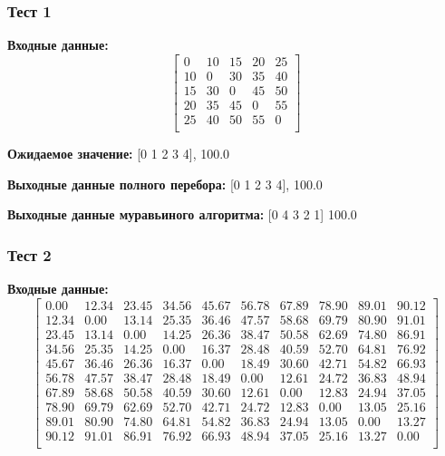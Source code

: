 \subsubsection{Тест 1}

\textbf{Входные данные:}
\[
\begin{bmatrix}
	0 & 10 & 15 & 20 & 25 \\
	10 & 0 & 30 & 35 & 40 \\
	15 & 30 & 0 & 45 & 50 \\
	20 & 35 & 45 & 0 & 55 \\
	25 & 40 & 50 & 55 & 0 \\
\end{bmatrix}
\]

\textbf{Ожидаемое значение:} [0 1 2 3 4], 100.0


\textbf{Выходные данные полного перебора:} [0 1 2 3 4], 100.0


\textbf{Выходные данные муравьиного алгоритма:} [0 4 3 2 1] 100.0


\subsubsection{Тест 2}

\textbf{Входные данные:}
\[
\begin{bmatrix}
	0.00 & 12.34 & 23.45 & 34.56 & 45.67 & 56.78 & 67.89 & 78.90 & 89.01 & 90.12 \\
	12.34 & 0.00 & 13.14 & 25.35 & 36.46 & 47.57 & 58.68 & 69.79 & 80.90 & 91.01 \\
	23.45 & 13.14 & 0.00 & 14.25 & 26.36 & 38.47 & 50.58 & 62.69 & 74.80 & 86.91 \\
	34.56 & 25.35 & 14.25 & 0.00 & 16.37 & 28.48 & 40.59 & 52.70 & 64.81 & 76.92 \\
	45.67 & 36.46 & 26.36 & 16.37 & 0.00 & 18.49 & 30.60 & 42.71 & 54.82 & 66.93 \\
	56.78 & 47.57 & 38.47 & 28.48 & 18.49 & 0.00 & 12.61 & 24.72 & 36.83 & 48.94 \\
	67.89 & 58.68 & 50.58 & 40.59 & 30.60 & 12.61 & 0.00 & 12.83 & 24.94 & 37.05 \\
	78.90 & 69.79 & 62.69 & 52.70 & 42.71 & 24.72 & 12.83 & 0.00 & 13.05 & 25.16 \\
	89.01 & 80.90 & 74.80 & 64.81 & 54.82 & 36.83 & 24.94 & 13.05 & 0.00 & 13.27 \\
	90.12 & 91.01 & 86.91 & 76.92 & 66.93 & 48.94 & 37.05 & 25.16 & 13.27 & 0.00 \\
\end{bmatrix}
\]


